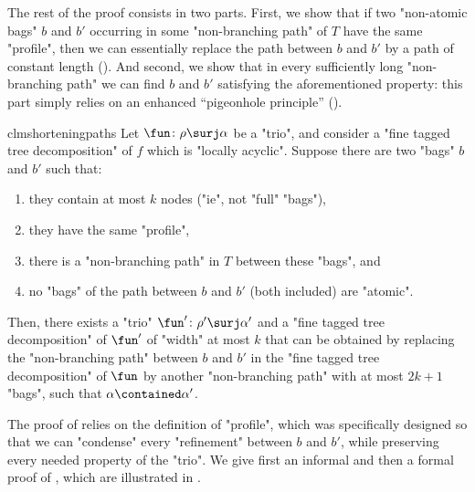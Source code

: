 The rest of the proof consists in two parts.
First, we show that if two "non-atomic bags" $b$ and $b'$
occurring in some "non-branching path"
of $T$ have the same "profile", then we can essentially replace 
the path between $b$ and $b'$ by a path of constant length (). And second, we show that in every sufficiently long "non-branching path"
we can find $b$ and $b'$ satisfying the aforementioned property: this
part simply relies on an enhanced ``pigeonhole principle'' ().

\begin{restatable}{clm}{shorteningpaths}
    \AP\label{claim:shortening-paths}
	Let $\fun\colon \rho \surj \alpha$ be a "trio", and consider a
	"fine tagged tree decomposition" of $f$ which is "locally acyclic".
    Suppose there are two "bags" $b$ and $b'$ such that:
	\begin{enumerate}
		\item they contain at most $k$ nodes ("ie", not "full" "bags"),
		\item they have the same "profile",
		\item there is a "non-branching path" in $T$ between these "bags", and
		\item no "bags" of the path between $b$ and $b'$ (both included) are "atomic".
	\end{enumerate}
	Then, there exists a "trio" $\fun'\colon \rho' \surj \alpha'$ and a
    "fine tagged tree decomposition" of $\fun'$ of "width" at most $k$
    that can be obtained by replacing the "non-branching path" between $b$ and $b'$
    in the "fine tagged tree decom\-position" of
    $\fun$ by another "non-branching path" with at most 
    $2k+1$ "bags", such that $\alpha \contained \alpha'$.
\end{restatable}
The proof of  relies on the definition of "profile", which
was specifically designed so that we can "condense" every "refinement" between $b$ and $b'$,
while preserving every needed property of the "trio".
We give first an informal and then a formal proof of , which are 
illustrated in .

